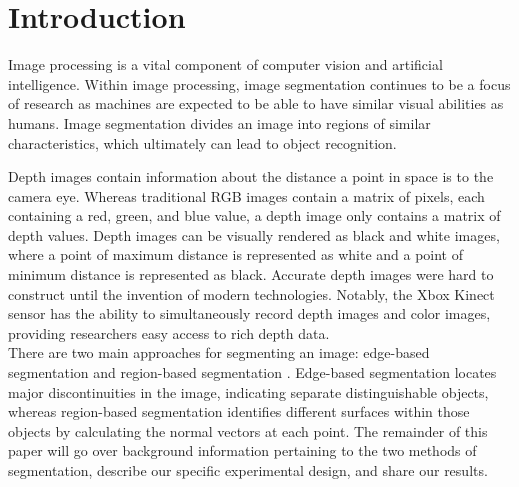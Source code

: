 
\section{Introduction}
\label{sec:intro}
Image processing is a vital component of computer vision and
artificial intelligence. Within image processing, image segmentation
continues to be a focus of research as machines are expected to be
able to have similar visual abilities as humans. Image segmentation
divides an image into regions of similar characteristics, which
ultimately can lead to object recognition. 

Depth images contain information about the distance a point in space
is to the camera eye. Whereas traditional RGB images contain a matrix
of pixels, each containing a red, green, and blue value, a depth image
only contains a matrix of depth values. Depth images can be visually
rendered as black and white images, where a point of maximum distance
is represented as white and a point of minimum distance is represented
as black. Accurate depth images were hard to construct until the
invention of modern technologies. Notably, the Xbox Kinect sensor
has the ability to simultaneously record depth images and color
images, providing researchers easy access to rich depth data.\\

There are two main approaches for segmenting an image: edge-based
segmentation and region-based segmentation \cite{aima}. Edge-based
segmentation locates major discontinuities in the image, indicating
separate distinguishable objects, whereas region-based segmentation
identifies different surfaces within those objects by calculating the
normal vectors at each point. The remainder of this paper will go over
background information pertaining to the two methods of segmentation,
describe our specific experimental design, and share our results. 


